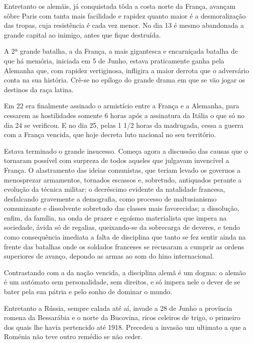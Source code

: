 \documentclass[9pt]{article}
\begin{document}
Entretanto os alemãis, já conquistada tôda a costa norte da Fran\-ça,
avan\-çam sôbre Paris com tanta mais facilidade e rapidez quanto maior é
a desmoraliza\-ção das tropas, cuja resistência é cada vez menor. No dia
13 é mesmo abandonada a gran\-de capital ao inimigo, antes que fique destruída.

A 2ª gran\-de bata\-lha, a da Fran\-ça, a mais gigantesca e encarniçada
bata\-lha de que há memória, iniciada em 5 de Junho, estava praticamente
ganha pela Alemanha que, com rapidez vertiginosa, infligira a maior derrota que o adversário conta na sua his\-tó\-ria. Crê-se no epílogo do gran\-de
drama em que se vão jogar os destinos da raça latina.

Em 22 era finalmente assinado o armistício entre a Fran\-ça e a Alemanha, para cessarem as hostilidades somente 6 horas após a assinatura
da Itália o que só no dia 24 se verificou. E no dia 25, pelas 1 1/2 horas da madrugada, cessa a guerra com a Fran\-ça vencida, que hoje decreta
luto na\-cio\-nal no seu território.

Estava terminado o gran\-de insucesso. Começa agora a discussão das
causas que o tornaram possível com surpreza de todos aqueles que julgavam invencível a Fran\-ça. O alastramento das ideias comunistas, que teriam levado os governos a menosprezar armamentos, tornados escassos e,
sobretudo, antiquados perante a evolu\-ção da técnica militar; o decréscimo evidente da natalidade francesa, desfalcando gravemente a demografia,
como processo de maltusianismo comunizante e dissolvente sobretudo das
classes mais favorecidas; a dissolu\-ção, enfim, da fa\-mí\-lia, na onda de prazer
e egoísmo materialista que impera na so\-cie\-dade, ávida só de regalias, queixando-se da sobrecarga de deveres, e tendo como consequência imediata a
falta de disciplina que tanto se fez sentir ainda na frente das bata\-lhas
onde os soldados franceses se recusaram a cumprir as ordens superiores
de avanço, depondo as armas ao som do hino interna\-cio\-nal.

Contrastando com a da na\-ção vencida, a disciplina alemã é um do\-gma:
o alemão é um autómato sem personalidade, sem direitos, e só impera nele
o dever de se bater pela sua pátria e pelo sonho de dominar o mundo.

Entretanto a Rússia, sempre calada até aí, invade a 28 de Junho a
província romena da Bessarábia e o norte da Bucovina, ricos celeiros
de trigo, o primeiro dos quais lhe havia pertencido até 1918. Precedeu
a invasão um ultimato a que a Roménia não teve outro remédio se não ceder.
\end{document}
